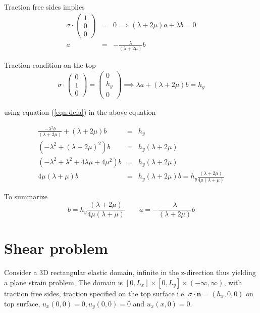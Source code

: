 \documentclass[12pt]{article}
\newcommand{\beq}{\begin{equation}}
\newcommand{\eeq}{\end{equation}}
\newcommand{\ber}{\begin{eqnarray}}
\newcommand{\eer}{\end{eqnarray}}
\begin{document}
      
 Traction free sides implies
      \ber
      \sigma\cdot\begin{pmatrix}1 \\ 0 \\ 0\end{pmatrix} &=& 0 \implies      (\lambda+2\mu)a + \lambda{b}=0 \\
      a &=& -\frac{\lambda}{(\lambda+2\mu)}b \label{eqn:defa}
      \eer

      Traction condition on the top
      \ber
      \sigma\cdot\begin{pmatrix}0\\1\\0\end{pmatrix} = \begin{pmatrix}0\\h_y\\0\end{pmatrix} \implies \lambda{a} + (\lambda+2\mu)b = h_y
        \eer

        using equation (\ref{eqn:defa}) in the above equation

        \ber
        \frac{-\lambda^2b}{(\lambda+2\mu)} + (\lambda+2\mu)b &=& h_y \\
        (-\lambda^2 + (\lambda+2\mu)^2)b &=& h_y(\lambda+2\mu)\\
        (-\lambda^2 + \lambda^2 + 4\lambda\mu + 4\mu^2)b &=& h_y(\lambda+2\mu)\\
        4\mu(\lambda+\mu)b &=& h_y(\lambda+2\mu)
        b = h_y\frac{(\lambda+2\mu)}{4\mu(\lambda+\mu)}
        \eer

        To summarize
        \beq
        b = h_y\frac{(\lambda+2\mu)}{4\mu(\lambda+\mu)} \qquad  a = -\frac{\lambda}{(\lambda+2\mu)}b 
        \eeq
\section{Shear problem}        
Consider a 3D rectangular elastic domain, infinite in the z-direction thus yielding a plane strain problem. The domain is  $[0,L_x]\times[0,L_y]\times(-\infty,\infty)$, with traction free sides, traction specified on the top surface i.e. $\sigma\cdot{\mathbf{n}}=(h_x,0

,0)$ on top surface, $u_x(0,0)=0,u_y(0,0)=0$ and $u_x(x,0)=0$.
\end{document}
